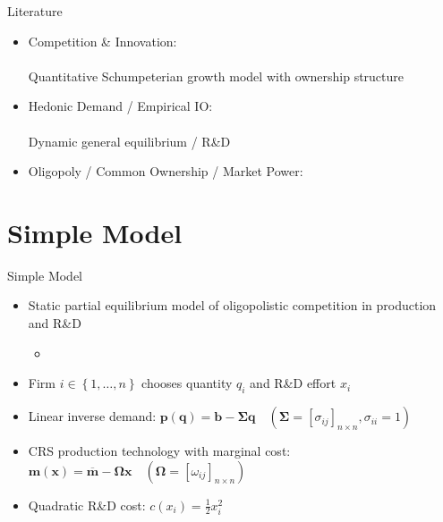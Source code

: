 \documentclass[
  10pt,
  aspectratio=169,   %
  handout           %
]{beamer}
\theoremstyle{plain}
\begin{document}
\begin{frame}{Literature}
  \begin{itemize}
    \item Competition \& Innovation: \\
          {\footnotesize\citet{d-Aspremont1988-je,Kamien1992-la,Aghion2001-yc,Aghion2005-vw,Acemoglu2012-bj,Aghion2013-nq,Bloom2013-pn,Lopez2019-sl,Peters2020-sd,Akcigit2021-ns,Akcigit2023-zl,Liu2022-iw,Cavenaile2023-lo,Anton2023-ej,Anton2024-pw,Kini2024-kd,Hopenhayn2024-ya}}\\
          \alert{Quantitative Schumpeterian growth model with ownership structure}
    \item Hedonic Demand / Empirical IO: \\
          {\footnotesize\citet{Lancaster1966-sg,Rosen1974-ep,Berry1995-lx,Nevo2001-ja,Pellegrino2024-dn,Ederer2024-rw}}\\
          \alert{Dynamic general equilibrium / R\&D}
    \item Oligopoly / Common Ownership / Market Power: \\
          {\footnotesize\citet{Rubinstein1983-pi,Rotemberg1984-jz,Neary2003-sn,Atkeson2008-zc,Gutierrez2017-wl,He2017-ix,Azar2018-cc,Azar2022-cn,Autor2020-mr,Baqaee2020-eb,De_Loecker2020-jn,Azar2021-uh,Edmond2023-bg}}
  \end{itemize}
\end{frame}

\section{Simple Model}

\begin{frame}{Simple Model}
  \begin{itemize}
    \item Static partial equilibrium model of oligopolistic competition in production and R\&D
    \begin{itemize}
      \item {\footnotesize \citet{d-Aspremont1988-je,Kamien1992-la,Leahy1997-xr,Lopez2019-sl,Anton2024-pw}} %
    \end{itemize}
    \medskip{}
    \item Firm $i\in \left\{1,\ldots, n\right\}$ chooses quantity $q_i$ and R\&D effort $x_i$
    \medskip{}
    \item Linear inverse demand: $\bm{p}(\bm{q}) = \bm{b} - \bm{\Sigma} \bm{q} \quad (\bm{\Sigma} =[\sigma_{ij}]_{n \times n}, \sigma_{ii} = 1)$
    \medskip{}
    \item CRS production technology with marginal cost: $\bm{m}(\bm{x}) = \overline{\bm{m}} - \bm{\Omega} \bm{x} \quad (\bm{\Omega} =[\omega_{ij}]_{n \times n})$
    \medskip{}
    \item Quadratic R\&D cost: $c(x_i) = \frac{1}{2}x_i^2$
  \end{itemize}
\end{frame}
\end{document}
